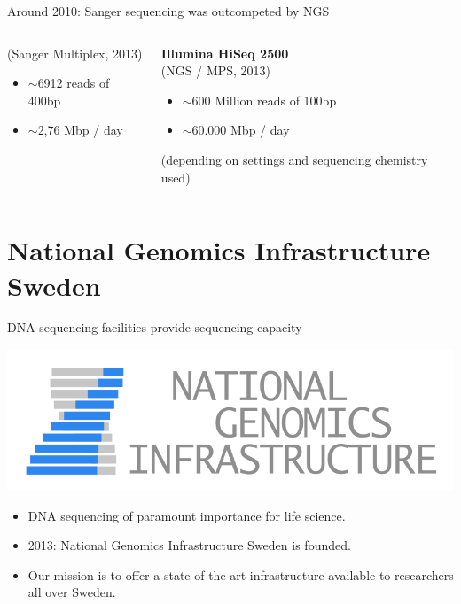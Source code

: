 \documentclass[10pt]{beamer}
\begin{document}
\begin{frame}{Around 2010: Sanger sequencing was outcompeted by NGS}
\begin{columns}[T,onlytextwidth]
\begin{exampleblock}{}
			(Sanger Multiplex, 2013)
			\begin{itemize}
				\item $\sim$6912 reads of 400bp
				\item $\sim$2,76 Mbp / day
			\end{itemize}
		\end{exampleblock}
		\begin{exampleblock}{}
			\textbf{Illumina HiSeq 2500}  \vspace{0.3em} \\
			(NGS / MPS, 2013)
			\begin{itemize}
				\item $\sim$600 Million reads of 100bp
				\item $\sim$60.000 Mbp / day
			\end{itemize}
			{ \small (depending on settings and sequencing chemistry used)}
		\end{exampleblock}
	\end{columns}
\end{frame}


\section{National Genomics Infrastructure Sweden}


\begin{frame}{DNA sequencing facilities provide sequencing capacity}
	\begin{center}
	\hspace*{-1cm}
	\includegraphics[height=0.2\textheight]{./additional_graphics/NGI-logo.png}
	\end{center}
	\begin{itemize}
		\item DNA sequencing of paramount importance for life science.
		\item 2013: National Genomics Infrastructure Sweden is founded.
		\item Our mission is to offer a state-of-the-art infrastructure available to researchers all over Sweden.
     \end{itemize}
\end{frame}
\end{document}
